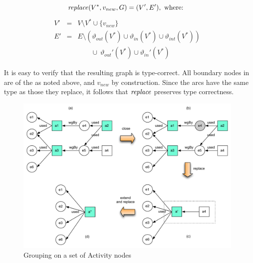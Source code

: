 % 

\noindent
{}
\vspace*{10pt}
\begin{definition}[replace]
\label{def:group-replace}

\[ \mathit{replace} (V^*, v_{new}, G) = (V', E'), \mbox{ where: } \]
\begin{eqnarray*}
V' & = & V  \setminus V^*  \cup \{v_{new}\}\\
E' & = & E  \setminus (\vartheta_{out}(V^*) \cup \vartheta_{in}(V^*) \cup \vartheta_{int}(V^*))  \\
   & & \qquad \cup\  \vartheta_{out}'(V^*)  \cup \vartheta_{in}'(V^*)
\end{eqnarray*}
\end{definition}

It is easy to verify that the resulting graph is type-correct. All boundary nodes in   are of the  as noted above, and   $v_{new}$   by construction.
Since the arcs have the same type as those they replace, it follows that $\mathit{replace}$ preserves type correctness.



\begin{figure}
\centering
\includegraphics[scale=.5]{figures/convex-a-only.pdf} 
\caption{Grouping on a set of Activity nodes} \label{fig:convex-a-only}
\end{figure}

